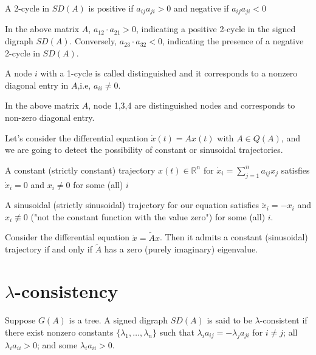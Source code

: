   
  \begin{dfn}
  	A 2-cycle in $SD(A)$ is positive if $a_{ij}a_{ji} > 0$ and negative if $a_{ij}a_{ji} < 0$
  \end{dfn}
   
   \begin{example}
   	 In the above matrix \( A \), \( a_{12} \cdot a_{21} > 0 \), indicating a positive 2-cycle in the signed digraph \( SD(A) \). Conversely, \( a_{23} \cdot a_{32} < 0 \), indicating the presence of a negative 2-cycle in \( SD(A) \).
   \end{example}

  \begin{dfn}
   	A node $i$ with a 1-cycle is called distinguished and it corresponds to a nonzero diagonal entry in $A$,i.e, $a_{ii} \neq 0$.
  \end{dfn}

   \begin{example}
   	 In the above matrix $A$, node 1,3,4 are distinguished nodes and corresponds to non-zero diagonal entry. 
   \end{example}

	Let's consider the differential equation $\dot{x}(t) = Ax(t)$ with $A \in Q(A)$, and we are going to detect the possibility of constant or sinusoidal trajectories.

   \begin{dfn}
   	A constant (strictly constant) trajectory $x(t) \in \mathbb{R}^n$ for $\dot{x}_i = \sum_{j=1}^n a_{ij}x_j$ satisfies $\dot{x}_i = 0$ and $x_i \neq 0$ for some (all) $i$
   	\end{dfn}
   
   \begin{dfn}
   	A sinusoidal (strictly sinusoidal) trajectory for our equation satisfies $\ddot{x}_i = -x_i$ and $x_i \not\equiv 0$ ("not the constant function with the value zero") for some (all) $i$.
   	\end{dfn}
   
   \begin{lem}
      Consider the differential equation $\dot{x} = \tilde{A}x$. Then it admits a constant (sinusoidal) trajectory if and only if $\tilde{A}$ has a zero (purely imaginary) eigenvalue.
   \end{lem}
 

 \section{$\lambda$-consistency}
 \begin{dfn}
 	Suppose $G(A)$ is a tree. A signed digraph $SD(A)$ is said to be $\lambda$-consistent if there exist nonzero constants $\{\lambda_1, \ldots, \lambda_n\}$ such that $\lambda_i a_{ij} = -\lambda_j a_{ji}$ for $i \neq j$; all $\lambda_ia_{ii} > 0$; and some $\lambda_ia_{ii} > 0$.
 	\end{dfn}

